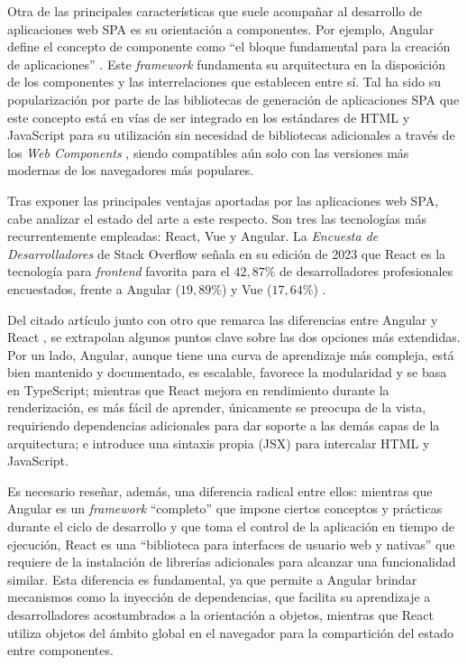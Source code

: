 Otra de las principales características que suele acompañar al desarrollo de aplicaciones web SPA es su orientación a componentes. Por ejemplo, Angular define el concepto de componente como ``el bloque fundamental para la creación de aplicaciones'' \cite{Angular_Componentes}. Este \textit{framework} fundamenta su arquitectura en la disposición de los componentes y las interrelaciones que establecen entre sí. Tal ha sido su popularización por parte de las bibliotecas de generación de aplicaciones SPA que este concepto está en vías de ser integrado en los estándares de HTML y JavaScript para su utilización sin necesidad de bibliotecas adicionales a través de los \textit{Web Components} \cite{WebComponents}, siendo compatibles aún solo con las versiones más modernas de los navegadores más populares.

Tras exponer las principales ventajas aportadas por las aplicaciones web SPA, cabe analizar el estado del arte a este respecto. Son tres las tecnologías más recurrentemente empleadas: React, Vue y Angular. La \textit{Encuesta de Desarrolladores} de Stack Overflow señala en su edición de 2023 que React es la tecnología para \textit{frontend} favorita para el $42,87\%$ de desarrolladores profesionales encuestados, frente a Angular ($19,89\%$) y Vue ($17,64\%$) \cite{subsec:tecAppAngularSurvey}.

Del citado artículo junto con otro que remarca las diferencias entre Angular y React \cite{AngularReact}, se extrapolan algunos puntos clave sobre las dos opciones más extendidas. Por un lado, Angular, aunque tiene una curva de aprendizaje más compleja, está bien mantenido y documentado, es escalable, favorece la modularidad y se basa en TypeScript; mientras que React mejora en rendimiento durante la renderización, es más fácil de aprender, únicamente se preocupa de la vista, requiriendo dependencias adicionales para dar soporte a las demás capas de la arquitectura; e introduce una sintaxis propia (JSX) para intercalar HTML y JavaScript.

Es necesario reseñar, además, una diferencia radical entre ellos: mientras que Angular es un \textit{framework} ``completo'' que impone ciertos conceptos y prácticas durante el ciclo de desarrollo y que toma el control de la aplicación en tiempo de ejecución, React es una ``biblioteca para interfaces de usuario web y nativas'' \cite{React} que requiere de la instalación de librerías adicionales para alcanzar una funcionalidad similar. Esta diferencia es fundamental, ya que permite a Angular brindar mecanismos como la inyección de dependencias, que facilita su aprendizaje a desarrolladores acostumbrados a la orientación a objetos, mientras que React utiliza objetos del ámbito global en el navegador para la compartición del estado entre componentes.

